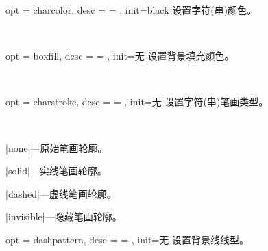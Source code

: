 \documentclass[full]{l3doc}
\begin{document}
\begin{documentation}
\bigskip

\begin{option}{ opt = charcolor, desc = {= }, init=black }
  设置字符(串)颜色。
\end{option}\\
\begin{SideBySideExample}[frame=single,numbers=left,xrightmargin=.45\linewidth,gobble=2]
  \centering
  \quad
  \quad
\end{SideBySideExample}

\bigskip

\begin{option}{ opt = boxfill, desc = {= }, init=无 }
  设置背景填充颜色。
\end{option}\\
\begin{SideBySideExample}[frame=single,numbers=left,xrightmargin=.45\linewidth,gobble=2]
  \centering
  \quad
  \quad
\end{SideBySideExample}

\bigskip

\begin{option}{ opt = charstroke, desc = {= }, init=无 }
  设置字符(串)笔画类型。
\end{option}\\
\begin{Description}
  \item |none|---原始笔画轮廓。
  \item |solid|---实线笔画轮廓。
  \item |dashed|---虚线笔画轮廓。
  \item |invisible|---隐藏笔画轮廓。
\end{Description}
\begin{SideBySideExample}[frame=single,numbers=left,xrightmargin=.45\linewidth,gobble=2]
  \centering
  \quad
  \quad
  \quad
\end{SideBySideExample}

\bigskip

\begin{option}{ opt = dashpattern, desc = {= }, init=无 }
  设置背景线线型。
\end{option}\\
\begin{SideBySideExample}[frame=single,numbers=left,xrightmargin=.25\linewidth,gobble=2]
  \centering
  \quad
\end{SideBySideExample}


\end{documentation}
\end{document}
